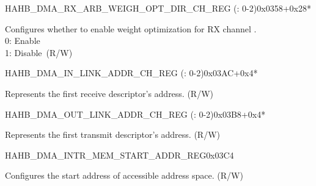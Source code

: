 \begin{register}{H}{AHB\_DMA\_RX\_ARB\_WEIGH\_OPT\_DIR\_CH\_REG (: 0-2)}{0x0358+0x28*}\label{regdesc:AHBDMARXARBWEIGHOPTDIRCHNREG}
%
%
\regnewline%
\begin{regdesc}\begin{reglist}
\label{fielddesc:AHBDMARXARBWEIGHOPTDIRCHN}\item [AHB\_DMA\_RX\_ARB\_WEIGH\_OPT\_DIR\_CH\regindex{n}]Configures whether to enable weight optimization for RX channel .\\
0: Enable\\
1: Disable\ (R/W)
\end{reglist}\end{regdesc}
\end{register}


\begin{register}{H}{AHB\_DMA\_IN\_LINK\_ADDR\_CH\_REG (: 0-2)}{0x03AC+0x4*}\label{regdesc:AHBDMAINLINKADDRCHNREG}
%
\regnewline%
\begin{regdesc}\begin{reglist}
\label{fielddesc:AHBDMAINLINKADDRCHN}\item [AHB\_DMA\_INLINK\_ADDR\_CH\regindex{n}] Represents the first receive descriptor's address. (R/W)
\end{reglist}\end{regdesc}
\end{register}


\begin{register}{H}{AHB\_DMA\_OUT\_LINK\_ADDR\_CH\_REG (: 0-2)}{0x03B8+0x4*}\label{regdesc:AHBDMAOUTLINKADDRCHNREG}
%
\regnewline%
\begin{regdesc}\begin{reglist}
\label{fielddesc:AHBDMAOUTLINKADDRCHN}\item [AHB\_DMA\_OUTLINK\_ADDR\_CH\regindex{n}] Represents the first transmit descriptor's address. (R/W)
\end{reglist}\end{regdesc}
\end{register}


\begin{register}{H}{AHB\_DMA\_INTR\_MEM\_START\_ADDR\_REG}{0x03C4}\label{regdesc:AHBDMAINTRMEMSTARTADDRREG}
%
\regnewline%
\begin{regdesc}\begin{reglist}
\label{fielddesc:AHBDMAACCESSINTRMEMSTARTADDR}\item [AHB\_DMA\_ACCESS\_INTR\_MEM\_START\_ADDR] Configures the start address of accessible address space. (R/W)
\end{reglist}\end{regdesc}
\end{register}


